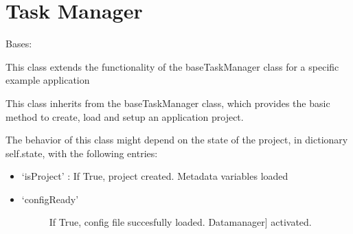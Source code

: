 \documentclass[letterpaper,10pt,english]{sphinxmanual}
\begin{document}
\chapter{Task Manager}
\label{\detokenize{dc_task_manager:task-manager}}\label{\detokenize{dc_task_manager::doc}}\label{\detokenize{dc_task_manager:module-src.task_manager}}

\begin{fulllineitems}
\label{\detokenize{dc_task_manager:src.task_manager.TaskManager}}
\sphinxAtStartPar
Bases: {\hyperref[\detokenize{dc_base_taskmanager:src.base_taskmanager.baseTaskManager}]{}}

\sphinxAtStartPar
This class extends the functionality of the baseTaskManager class for a
specific example application

\sphinxAtStartPar
This class inherits from the baseTaskManager class, which provides the
basic method to create, load and setup an application project.

\sphinxAtStartPar
The behavior of this class might depend on the state of the project, in
dictionary self.state, with the following entries:
\begin{itemize}
\item {} 
\sphinxAtStartPar
‘isProject’   : If True, project created. Metadata variables loaded

\item {} \begin{description}
\item[{‘configReady’}] \leavevmode{[}If True, config file succesfully loaded. Datamanager{]}
\sphinxAtStartPar
activated.


\end{description}
\end{itemize}
\end{fulllineitems}
\end{document}
